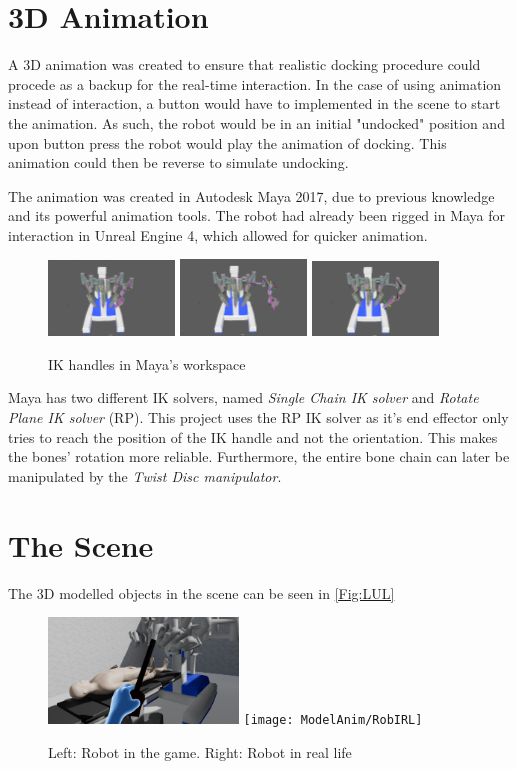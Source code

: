\section*{3D Animation}
A 3D animation was created to ensure that realistic docking procedure could procede as a backup for the real-time interaction. In the case of using animation instead of interaction, a button would have to implemented in the scene to start the animation. As such, the robot would be in an initial "undocked" position and upon button press the robot would play the animation of docking. This animation could then be reverse to simulate undocking.

The animation was created in Autodesk Maya 2017, due to previous knowledge and its powerful animation tools. The robot had already been rigged in Maya for interaction in Unreal Engine 4, which allowed for quicker animation.

\begin{figure}[hpbt]
	\centering
	\includegraphics[width=0.3\textwidth]{ModelAnim/IK1}
	\includegraphics[width=0.3\textwidth]{ModelAnim/IK2}
	\includegraphics[width=0.3\textwidth]{ModelAnim/IK3}
	\caption{IK handles in Maya's workspace}
\end{figure}

Maya has two different IK solvers, named \textit{Single Chain IK solver} and \textit{Rotate Plane IK solver} (RP). This project uses the RP IK solver as it's end effector only tries to reach the position of the IK handle and not the orientation. This makes the bones' rotation more reliable. Furthermore, the entire bone chain can later be manipulated by the \textit{Twist Disc manipulator}.

\section*{The Scene}

The 3D modelled objects in the scene can be seen in \autoref{Fig:LUL}

\begin{figure}[hpbt]
	\centering
	\includegraphics[width=0.45\textwidth]{ModelAnim/RobInGame}
	\texttt{[image: ModelAnim/RobIRL]}
	\caption{Left: Robot in the game. Right: Robot in real life}
	\label{Fig:LUL}
\end{figure}